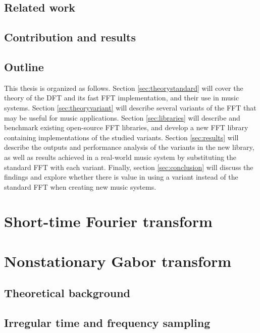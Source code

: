 \documentclass[letter,12pt,notitlepage]{article}
\begin{document}
\subsection{Related work}

\subsection{Contribution and results}

\subsection{Outline}

This thesis is organized as follows. Section \ref{sec:theorystandard} will cover the theory of the DFT and its fast FFT implementation, and their use in music systems. Section \ref{sec:theoryvariant} will describe several variants of the FFT that may be useful for music applications. Section \ref{sec:libraries} will describe and benchmark existing open-source FFT libraries, and develop a new FFT library containing implementations of the studied variants. Section \ref{sec:results} will describe the outputs and performance analysis of the variants in the new library, as well as results achieved in a real-world music system by substituting the standard FFT with each variant. Finally, section \ref{sec:conclusion} will discuss the findings and explore whether there is value in using a variant instead of the standard FFT when creating new music systems.

\vfill
\clearpage

\section{Short-time Fourier transform}
\label{sec:theorystft}

\vfill
\clearpage

\section{Nonstationary Gabor transform}
\label{sec:theorynsgt}

\subsection{Theoretical background}


\subsection{Irregular time and frequency sampling}
\end{document}
